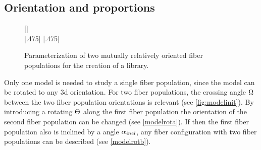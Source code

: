 \subsection{Orientation and proportions}\label{sec:modelParamet}
%
\begin{figure}[t]
\centering
\setlength{\tikzwidth}{0.40\textwidth}
{}
[\textwidth]{}
\\
%
[.475\textwidth]{}\hfill
{}
[.475\textwidth]{}
\caption{Parameterization of two mutually relatively oriented fiber populations for the creation of a library.}
\label{fig:twomodelpopdesign}
\end{figure}
%
Only one model is needed to study a single fiber population, since the model can be rotated to any 3d orientation. 
For two fiber populations, the crossing angle $\textnormal{$\Omega$}$ between the two fiber population orientations is relevant (see \cref{fig:modelinit}).
By introducing a rotating $\textnormal{$\Theta$}$ along the first fiber population the orientation of the second fiber population can be changed (see \cref{modelrota}).
If then the first fiber population also is inclined by a angle $\textnormal{$\alpha_{\mathit{incl}}$}$, any fiber configuration with two fiber populations can be described (see \cref{modelrotb}).
